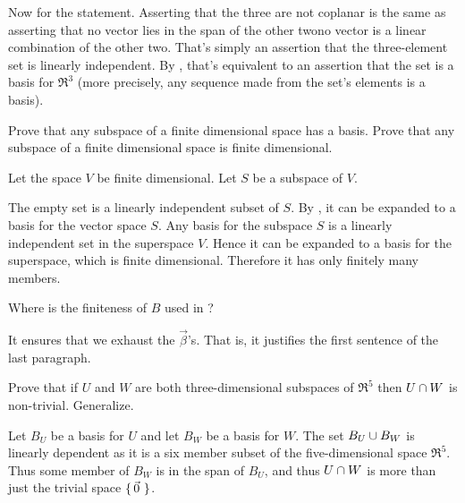 \begin{exercises}
\begin{answer}
      Now for the statement.
      Asserting that the three are not coplanar is the same as asserting that
      no vector lies in the span of the other two\Dash no vector is a linear
      combination of the other two.
      That's simply an assertion that the three-element set is linearly
      independent.
      By , that's equivalent to an
      assertion that the set is a basis for $\Re^3$ (more precisely, 
      any sequence made from the set's elements is a basis). 
    \end{answer}
  \item 
    \begin{exparts}
      \partsitem Prove that any subspace of a finite dimensional space
        has a basis. 
      \partsitem Prove that any subspace of a finite dimensional space is 
        finite dimensional.
    \end{exparts}
    \begin{answer}
      Let the space $V$ be finite dimensional.
      Let $S$ be a subspace of $V$.
      \begin{exparts}
        \partsitem The empty set is a linearly independent subset of $S$.
          By , it can be expanded to a basis
          for the vector space $S$. 
        \partsitem Any basis for the subspace $S$ is a linearly independent 
          set in the superspace $V$.
          Hence it can be expanded to a basis for the superspace, which is
          finite dimensional.
          Therefore it has only finitely many members.  
      \end{exparts}
    \end{answer}
  \item  
    Where is the finiteness of \( B \) used in
    ?
    \begin{answer}
      It ensures that we exhaust the \( \vec{\beta} \)'s.
      That is, it justifies the first sentence of the last paragraph. 
    \end{answer}
  \recommended \item
    Prove that if \( U \) and \( W \) are both three-dimensional
    subspaces of \( \Re^5 \) then \( U\cap W \) is non-trivial.
    Generalize.
    \begin{answer}
       Let \( B_U \) be a basis for \( U \) and let \( B_W \)
       be a basis for \( W \).
       The set \( B_U\cup B_W \) is linearly dependent as it is a
       six member subset of the five-dimensional space \( \Re^5 \).
       Thus some member of \( B_W \) is in the span of \( B_U \), and
       thus \( U\cap W \) is more than just the trivial space
       \( \mbox{$\{\,\vec{0}\,\,\}$} \).


\end{answer}
\end{exercises}
